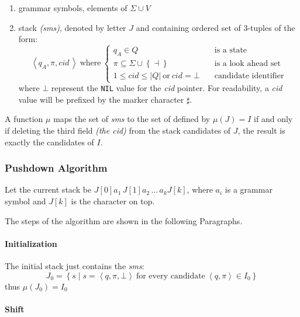\documentclass[english]{article}
\begin{document}
\begin{enumerate}
  \item grammar symbols, elements of \(\Sigma \cup V\)
  \item stack \mstates \textit{(sms)}, denoted by letter \(J\) and containing ordered set of \(3\)-tuples of the form:
        \[ \left\langle q_A, \pi, \textit{cid} \, \right\rangle \ \text{where} \ \begin{cases}
            q_A \in Q \quad                                                        & \text{is a state}           \\
            \pi \subseteq \Sigma \cup \left\{ \dashv \right\} \quad                & \text{is a look ahead set}  \\
            1 \leq \textit{cid} \leq | Q | \ \text{or} \ \textit{cid} = \bot \quad & \text{candidate identifier}
          \end{cases} \]
        where \(\bot\) represent the \texttt{NIL} value for the \textit{cid} pointer.
        For readability, a \textit{cid} value will be prefixed by the marker character \(\sharp\).
\end{enumerate}

A function \(\mu\) maps the set of \textit{sms} to the set of \mstates defined by \(\mu(J) = I\) if and only if deleting the third field \textit{(the cid)} from the stack candidates of \(J\), the result is exactly the candidates of \(I\).

\subsubsection{Pushdown Algorithm}

Let the current stack be \(J[0] a_1 \, J[1] a_2 \, \ldots \, a_k J[k]\), where \(a_i\) is a grammar symbol and \(J[k]\) is the character on top.

The steps of the algorithm are shown in the following Paragraphs.

\paragraph*{Initialization}

The initial stack just contains the \textit{sms}:
\[ J_0 = \left\{ s \mid s = \left\langle q, \pi, \bot \right\rangle \ \text{for every candidate} \ \left\langle q, \pi \right\rangle \in I_0 \right\} \]
thus \(\mu(J_0) = I_0\)

\paragraph*{Shift}
\end{document}
